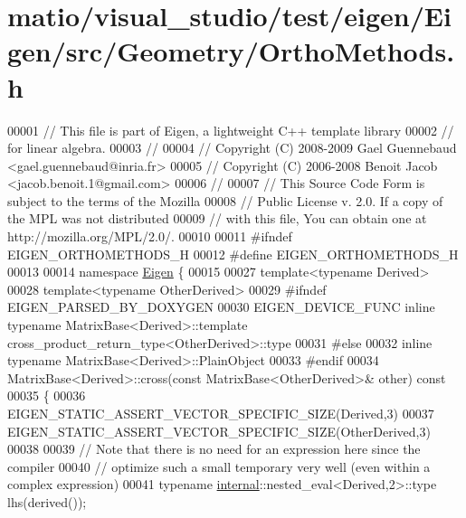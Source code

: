 \hypertarget{matio_2visual__studio_2test_2eigen_2_eigen_2src_2_geometry_2_ortho_methods_8h_source}{}\section{matio/visual\+\_\+studio/test/eigen/\+Eigen/src/\+Geometry/\+Ortho\+Methods.h}
\label{matio_2visual__studio_2test_2eigen_2_eigen_2src_2_geometry_2_ortho_methods_8h_source}

\begin{DoxyCode}
00001 \textcolor{comment}{// This file is part of Eigen, a lightweight C++ template library}
00002 \textcolor{comment}{// for linear algebra.}
00003 \textcolor{comment}{//}
00004 \textcolor{comment}{// Copyright (C) 2008-2009 Gael Guennebaud <gael.guennebaud@inria.fr>}
00005 \textcolor{comment}{// Copyright (C) 2006-2008 Benoit Jacob <jacob.benoit.1@gmail.com>}
00006 \textcolor{comment}{//}
00007 \textcolor{comment}{// This Source Code Form is subject to the terms of the Mozilla}
00008 \textcolor{comment}{// Public License v. 2.0. If a copy of the MPL was not distributed}
00009 \textcolor{comment}{// with this file, You can obtain one at http://mozilla.org/MPL/2.0/.}
00010 
00011 \textcolor{preprocessor}{#ifndef EIGEN\_ORTHOMETHODS\_H}
00012 \textcolor{preprocessor}{#define EIGEN\_ORTHOMETHODS\_H}
00013 
00014 \textcolor{keyword}{namespace }\hyperlink{namespace_eigen}{Eigen} \{ 
00015 
00027 \textcolor{keyword}{template}<\textcolor{keyword}{typename} Derived>
00028 \textcolor{keyword}{template}<\textcolor{keyword}{typename} OtherDerived>
00029 \textcolor{preprocessor}{#ifndef EIGEN\_PARSED\_BY\_DOXYGEN}
00030 EIGEN\_DEVICE\_FUNC \textcolor{keyword}{inline} \textcolor{keyword}{typename} MatrixBase<Derived>::template 
      cross\_product\_return\_type<OtherDerived>::type
00031 \textcolor{preprocessor}{#else}
00032 \textcolor{keyword}{inline} \textcolor{keyword}{typename} MatrixBase<Derived>::PlainObject
00033 \textcolor{preprocessor}{#endif}
00034 MatrixBase<Derived>::cross(\textcolor{keyword}{const} MatrixBase<OtherDerived>& other)\textcolor{keyword}{ const}
00035 \textcolor{keyword}{}\{
00036   EIGEN\_STATIC\_ASSERT\_VECTOR\_SPECIFIC\_SIZE(Derived,3)
00037   EIGEN\_STATIC\_ASSERT\_VECTOR\_SPECIFIC\_SIZE(OtherDerived,3)
00038 
00039   \textcolor{comment}{// Note that there is no need for an expression here since the compiler}
00040   \textcolor{comment}{// optimize such a small temporary very well (even within a complex expression)}
00041   typename \hyperlink{namespaceinternal}{internal}::nested\_eval<Derived,2>::type lhs(derived());

\end{DoxyCode}
